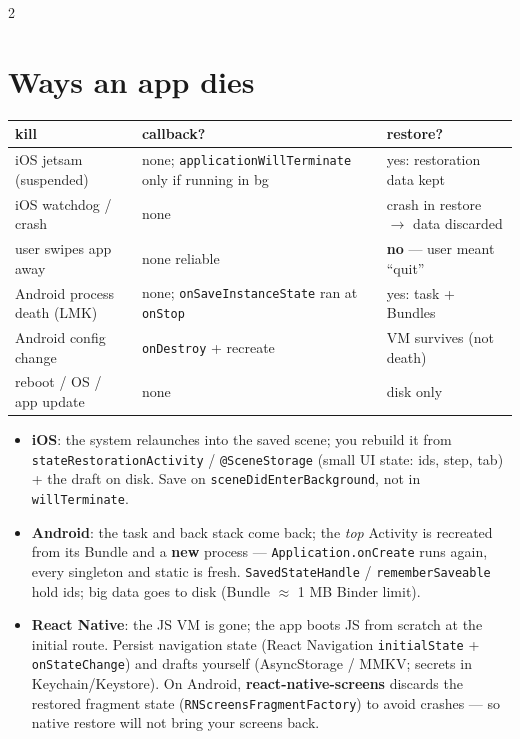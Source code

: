 \documentclass[8pt]{extarticle}
\newcommand\ct[1]{\texttt{#1}}
\begin{document}
\begin{multicols}{2}
\small{}\raggedright

\section{Ways an app dies}
{\footnotesize\setlength{\tabcolsep}{3pt}
\begin{tabular}{@{}>{\raggedright\arraybackslash}p{20mm}>{\raggedright\arraybackslash}p{29mm}>{\raggedright\arraybackslash}p{26mm}@{}}
\toprule
\textbf{kill} & \textbf{callback?} & \textbf{restore?}\\ \midrule
iOS jetsam (suspended) & none; \ct{applicationWillTerminate} only if running in bg & yes: restoration data kept\\
iOS watchdog / crash & none & crash in restore $\to$ data discarded\\
user swipes app away & none reliable & \textbf{no} — user meant ``quit''\\
Android process death (LMK) & none; \ct{onSaveInstanceState} ran at \ct{onStop} & yes: task + Bundles\\
Android config change & \ct{onDestroy} + recreate & VM survives (not death)\\
reboot / OS / app update & none & disk only\\
\bottomrule
\end{tabular}}
\begin{itemize}
  \item \textbf{iOS}: the system relaunches into the saved scene; you rebuild it
        from \ct{stateRestorationActivity} / \ct{@SceneStorage} (small UI state:
        ids, step, tab) + the draft on disk. Save on \ct{sceneDidEnterBackground},
        not in \ct{willTerminate}.
  \item \textbf{Android}: the task and back stack come back; the \emph{top}
        Activity is recreated from its Bundle and a \textbf{new} process —
        \ct{Application.onCreate} runs again, every singleton and static is fresh.
        \ct{SavedStateHandle} / \ct{rememberSaveable} hold ids; big data goes to
        disk (Bundle $\approx$ 1 MB Binder limit).
  \item \textbf{React Native}: the JS VM is gone; the app boots JS from scratch at
        the initial route. Persist navigation state (React Navigation
        \ct{initialState} + \ct{onStateChange}) and drafts yourself
        (AsyncStorage / MMKV; secrets in Keychain/Keystore). On Android,
        \textbf{react-native-screens} discards the restored fragment state
        (\ct{RNScreensFragmentFactory}) to avoid crashes — so native restore
        will not bring your screens back.
\end{itemize}


\end{multicols}
\end{document}
